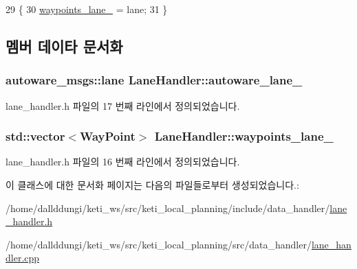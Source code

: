\begin{DoxyCode}
29 \{
30   \hyperlink{class_lane_handler_ac65a0139b3900a7c8dc3fe49d7a684f3}{waypoints\_lane\_} = lane;
31 \}
\end{DoxyCode}


\subsection{멤버 데이타 문서화}
\subsubsection[{\texorpdfstring{autoware\+\_\+lane\+\_\+}{autoware_lane_}}]{\setlength{\rightskip}{0pt plus 5cm}autoware\+\_\+msgs\+::lane Lane\+Handler\+::autoware\+\_\+lane\+\_\+}\hypertarget{class_lane_handler_a167378a780eafb8242f7b12bd5460ac0}{}\label{class_lane_handler_a167378a780eafb8242f7b12bd5460ac0}


lane\+\_\+handler.\+h 파일의 17 번째 라인에서 정의되었습니다.

\subsubsection[{\texorpdfstring{waypoints\+\_\+lane\+\_\+}{waypoints_lane_}}]{\setlength{\rightskip}{0pt plus 5cm}std\+::vector$<${\bf Way\+Point}$>$ Lane\+Handler\+::waypoints\+\_\+lane\+\_\+}\hypertarget{class_lane_handler_ac65a0139b3900a7c8dc3fe49d7a684f3}{}\label{class_lane_handler_ac65a0139b3900a7c8dc3fe49d7a684f3}


lane\+\_\+handler.\+h 파일의 16 번째 라인에서 정의되었습니다.



이 클래스에 대한 문서화 페이지는 다음의 파일들로부터 생성되었습니다.\+:\begin{DoxyCompactItemize}
\item 
/home/dallddungi/keti\+\_\+ws/src/keti\+\_\+local\+\_\+planning/include/data\+\_\+handler/\hyperlink{lane__handler_8h}{lane\+\_\+handler.\+h}\item 
/home/dallddungi/keti\+\_\+ws/src/keti\+\_\+local\+\_\+planning/src/data\+\_\+handler/\hyperlink{lane__handler_8cpp}{lane\+\_\+handler.\+cpp}\end{DoxyCompactItemize}
